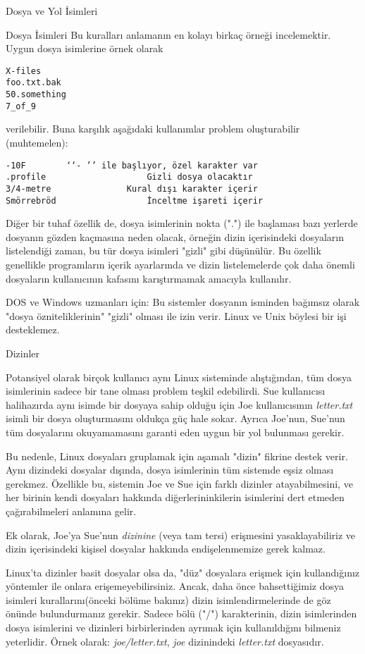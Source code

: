 \begin{section}{Dosya ve Yol İsimleri}
\begin{subsection}{Dosya İsimleri}
Bu kuralları anlamanın en kolayı birkaç örneği incelemektir. Uygun dosya isimlerine örnek olarak
\footnotesize
\begin{verbatim}
X-files
foo.txt.bak
50.something
7_of_9
\end{verbatim}
\normalsize 
verilebilir. Buna karşılık aşağıdaki kullanımlar problem oluşturabilir (muhtemelen):
\footnotesize
\begin{verbatim}
-10F 		‘‘- ’’ ile başlıyor, özel karakter var
.profile 					Gizli dosya olacaktır
3/4-metre 				Kural dışı karakter içerir
Smörrebröd 					İnceltme işareti içerir
\end{verbatim}
\normalsize 

Diğer bir tuhaf özellik de, dosya isimlerinin nokta (".") ile başlaması bazı yerlerde dosyanın gözden kaçmasına neden olacak, örneğin dizin içerisindeki dosyaların listelendiği zaman, bu tür dosya isimleri "gizli" gibi düşünülür. Bu özellik genellikle programların içerik ayarlarında ve dizin listelemelerde çok daha önemli dosyaların kullanıcının kafasını karıştırmamak amacıyla kullanılır.

DOS ve Windows uzmanları için: Bu sistemler dosyanın isminden bağımsız olarak "dosya özniteliklerinin" "gizli" olması ile izin verir. Linux ve Unix böylesi bir işi desteklemez.
\end{subsection}
\begin{subsection}{Dizinler}

Potansiyel olarak birçok kullanıcı aynı Linux sisteminde alıştığından, tüm dosya isimlerinin sadece bir tane olması problem teşkil edebilirdi. Sue kullanıcısı halihazırda aynı isimde bir dosyaya sahip olduğu için Joe kullanıcısının \emph{letter.txt} isimli bir dosya oluşturmasını oldukça güç hale sokar. Ayrıca Joe'nun, Sue'nun tüm dosyalarını okuyamamasını garanti eden uygun bir yol bulunması gerekir.

Bu nedenle, Linux dosyaları gruplamak için aşamalı  "dizin" fikrine destek verir. Aynı dizindeki dosyalar dışında, dosya isimlerinin  tüm sistemde eşsiz olması gerekmez. Özellikle bu, sistemin Joe ve Sue için farklı dizinler atayabilmesini, ve her birinin kendi dosyaları hakkında diğerlerininkilerin isimlerini dert etmeden çağırabilmeleri anlamına gelir.
	
Ek olarak, Joe'ya Sue'nun \emph{dizinine} (veya tam tersi) erişmesini yasaklayabiliriz ve dizin içerisindeki kişisel dosyalar hakkında endişelenmemize gerek kalmaz.
	
Linux'ta dizinler basit dosyalar olsa da, "düz" dosyalara erişmek için kullandığınız yöntemler ile onlara erişemeyebilirsiniz. Ancak, daha önce bahsettiğimiz dosya isimleri kurallarını(önceki bölüme bakınız) dizin isimlendirmelerinde de göz önünde bulundurmanız gerekir. Sadece bölü ("/") karakterinin, dizin isimlerinden dosya isimlerini ve dizinleri birbirlerinden ayrımak için kullanıldığını bilmeniz yeterlidir. Örnek olarak: \emph{joe/letter.txt}, \emph{joe} dizinindeki \emph{letter.txt} dosyasıdır.
	

\end{subsection}
\end{section}
